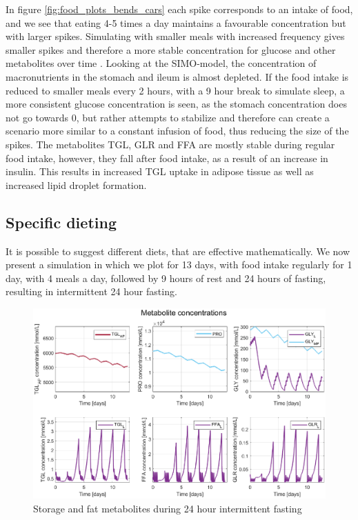 \documentclass{IEEEtran}
\begin{document}
In figure \ref{fig:food_plots_bends_cars} each spike corresponds to an intake of food, and we see that eating 4-5 times a day maintains a favourable concentration but with larger spikes. Simulating with smaller meals with increased frequency gives smaller spikes and therefore a more stable concentration for glucose and other metabolites over time \cite{derendorf_schmidt_rowland_tozer_2020}. Looking at the SIMO-model, the concentration of macronutrients in the stomach and ileum is almost depleted. If the food intake is reduced to smaller meals every 2 hours, with a 9 hour break to simulate sleep, a more consistent glucose concentration is seen, as the stomach concentration does not go towards 0, but rather attempts to stabilize and therefore can create a scenario more similar to a constant infusion of food, thus reducing the size of the spikes. The metabolites TGL, GLR and FFA are mostly stable during regular food intake, however, they fall after food intake, as a result of an increase in insulin. This results in increased TGL uptake in adipose tissue as well as increased lipid droplet formation.


\subsection{Specific dieting}

It is possible to suggest different diets, that are effective mathematically. We now present a simulation in which we plot for 13 days, with food intake regularly for 1 day, with 4 meals a day, followed by 9 hours of rest and 24 hours of fasting, resulting in intermittent 24 hour fasting. 

\begin{figure}[H]
    \centering
    \includegraphics[trim=40 10 40 0, width=\columnwidth] {Diagrams/Food/metabolites_13_days_no_food_33_hours.eps}
    \caption{Storage and fat metabolites during 24 hour intermittent fasting}
    \label{fig:my_label}
\end{figure}
\end{document}
